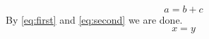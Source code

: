 \documentclass{article}
\begin{document}
\begin{equation}
a = b + c \label{eq:first}
\end{equation}
By \autoref{eq:first} and \ref{eq:second} we are done.
\begin{equation}
x = y \label{eq:second}
\end{equation}
\end{document}
